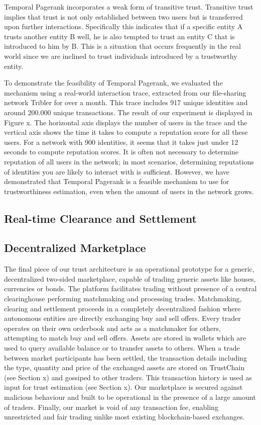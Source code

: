 \documentclass[USenglish]{article}
\begin{document}
Temporal Pagerank incorporates a weak form of transitive trust.
Transitive trust implies that trust is not only established between two users but is transferred upon further interactions.
Specifically this indicates that if a specific entity A trusts another entity B well, he is also tempted to trust an entity C that is introduced to him by B.
This is a situation that occurs frequently in the real world since we are inclined to trust individuals introduced by a trustworthy entity.

To demonstrate the feasibility of Temporal Pagerank, we evaluated the mechanism using a real-world interaction trace, extracted from our file-sharing network Tribler for over a month.
This trace includes 917 unique identities and around 200.000 unique transactions.
The result of our experiment is displayed in Figure x.
The horizontal axis displays the number of users in the trace and the vertical axis shows the time it takes to compute a reputation score for all these users.
For a network with 900 identities, it seems that it takes just under 12 seconds to compute reputation scores.
It is often not necessary to determine reputation of all users in the network; in most scenarios, determining reputations of identities you are likely to interact with is sufficient.
However, we have demonstrated that Temporal Pagerank is a feasible mechanism to use for trustworthiness estimation, even when the amount of users in the network grows.

\subsection{Real-time Clearance and Settlement}

\subsection{Decentralized Marketplace}

The final piece of our trust architecture is an operational prototype for a generic, decentralized two-sided marketplace, capable of trading generic assets like houses, currencies or bonds.
The platform facilitates trading without presence of a central clearinghouse performing matchmaking and processing trades.
Matchmaking, clearing and settlement proceeds in a completely decentralized fashion where autonomous entities are directly exchanging buy and sell offers.
Every trader operates on their own orderbook and acts as a matchmaker for others, attempting to match buy and sell offers.
Assets are stored in wallets which are used to query available balance or to transfer assets to others.
When a trade between market participants has been settled, the transaction details including the type, quantity and price of the exchanged assets are stored on TrustChain (see Section x) and gossiped to other traders.
This transaction history is used as input for trust estimation (see Section x).
Our marketplace is secured against malicious behaviour and built to be operational in the presence of a large amount of traders.
Finally, our market is void of any transaction fee, enabling unrestricted and fair trading unlike most existing blockchain-based exchanges.
\end{document}
